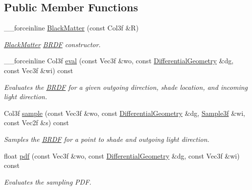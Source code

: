 \subsection*{Public Member Functions}
\begin{DoxyCompactItemize}
\item 
\_\-\_\-forceinline \hyperlink{classembree_1_1_black_matter_a6e820cc78db4303f9924ccd19892479f}{BlackMatter} (const Col3f \&R)
\begin{DoxyCompactList}\small\item\em \hyperlink{classembree_1_1_black_matter}{BlackMatter} \hyperlink{classembree_1_1_b_r_d_f}{BRDF} constructor. \item\end{DoxyCompactList}\item 
\_\-\_\-forceinline Col3f \hyperlink{classembree_1_1_black_matter_aeb4ef4667f766af07ca4ec4e630a9d46}{eval} (const Vec3f \&wo, const \hyperlink{structembree_1_1_differential_geometry}{DifferentialGeometry} \&dg, const Vec3f \&wi) const 
\begin{DoxyCompactList}\small\item\em Evaluates the \hyperlink{classembree_1_1_b_r_d_f}{BRDF} for a given outgoing direction, shade location, and incoming light direction. \item\end{DoxyCompactList}\item 
Col3f \hyperlink{classembree_1_1_black_matter_a0955e03be1befc21396eee1c1bf66d8b}{sample} (const Vec3f \&wo, const \hyperlink{structembree_1_1_differential_geometry}{DifferentialGeometry} \&dg, \hyperlink{structembree_1_1_sample}{Sample3f} \&wi, const Vec2f \&s) const 
\begin{DoxyCompactList}\small\item\em Samples the \hyperlink{classembree_1_1_b_r_d_f}{BRDF} for a point to shade and outgoing light direction. \item\end{DoxyCompactList}\item 
float \hyperlink{classembree_1_1_black_matter_a0751d955ba33a4fc23ebbe63fde6ad27}{pdf} (const Vec3f \&wo, const \hyperlink{structembree_1_1_differential_geometry}{DifferentialGeometry} \&dg, const Vec3f \&wi) const 
\begin{DoxyCompactList}\small\item\em Evaluates the sampling PDF. \item\end{DoxyCompactList}\end{DoxyCompactItemize}


